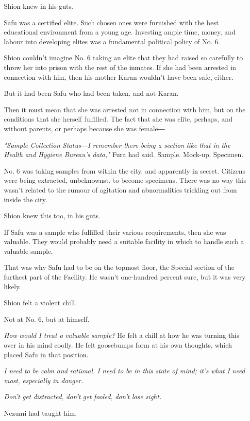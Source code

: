 Shion knew in his guts.

Safu was a certified elite. Such chosen ones were furnished with the
best educational environment from a young age. Investing ample time,
money, and labour into developing elites was a fundamental political
policy of No. 6.

Shion couldn't imagine No. 6 taking an elite that they had raised so
carefully to throw her into prison with the rest of the inmates. If she
had been arrested in connection with him, then his mother Karan wouldn't
have been safe, either.

But it had been Safu who had been taken, and not Karan.

Then it must mean that she was arrested not in connection with him, but
on the conditions that she herself fulfilled. The fact that she was
elite, perhaps, and without parents, or perhaps because she was female―

\emph{"Sample Collection Status―I remember there being a section like that in
	the Health and Hygiene Bureau's data,"} Fura had said. Sample. Mock-up.
Specimen.

No. 6 was taking samples from within the city, and apparently in secret.
Citizens were being extracted, unbeknownst, to become specimens. There
was no way this wasn't related to the rumour of agitation and
abnormalities trickling out from inside the city.

Shion knew this too, in his guts.

If Safu was a sample who fulfilled their various requirements, then she
was valuable. They would probably need a suitable facility in which to
handle such a valuable sample.

That was why Safu had to be on the topmost floor, the Special section of
the furthest part of the Facility. He wasn't one-hundred percent sure,
but it was very likely.

Shion felt a violent chill.

Not at No. 6, but at himself.

\emph{How would I treat a valuable sample?} He felt a chill at how he was
turning this over in his mind coolly. He felt goosebumps form at his own
thoughts, which placed Safu in that position.

\emph{I need to be calm and rational. I need to be in this state of mind; it's
	what I need most, especially in danger.}

\emph{Don't get distracted, don't get fooled, don't lose sight.}

Nezumi had taught him.

